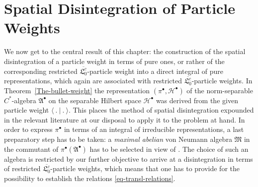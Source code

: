 \documentclass[11pt,twoside,openright]{report}
\theoremstyle{definition}
\theoremstyle{plain}
\theoremstyle{remark}
\theoremstyle{assumption}
\newcommand{\scp}[2]{\langle #1 \vert #2 \rangle}
\newcommand{\Mfrak}{\mathfrak{M}}
\newcommand{\vaccountbar}{\overline{\mathfrak{L}_0^c}}
\newcommand{\Hbullet}{\mathscr{H}^\bullet}
\newcommand{\Abullet}{\mathfrak{A}^\bullet}
\begin{document}
\section[Spatial Disintegration]{Spatial Disintegration of Particle
  Weights}
  \label{sec-spatial-disintegration}

We now get to the central result of this chapter: the construction of
the spatial disintegration of a particle weight in terms of pure ones,
or rather of the corresponding restricted $\vaccountbar$-particle
weight into a direct integral of pure representations, which again
are associated with restricted $\vaccountbar$-particle weights. In
Theorem~\ref{The-bullet-weight} the representation $( \pi^\bullet ,
\Hbullet )$ of the norm-separable $C^*$-algebra $\Abullet$ on the
separable Hilbert space $\Hbullet$ was derived from the given particle
weight $\scp{~.~}{~.~}$. This places the method of spatial
disintegration expounded in the relevant literature at our disposal to
apply it to the problem at hand. In order to express $\pi^\bullet$ in
terms of an integral of irreducible representations, a last
preparatory step has to be taken: a \emph{maximal abelian} von Neumann
algebra $\Mfrak$ in the commutant of $\pi^\bullet ( \Abullet )$ has to
be selected in view of \cite[Theorem~8.5.2]{dixmier:1982}. The choice
of such an algebra is restricted by our further objective to arrive at
a disintegration in terms of restricted $\vaccountbar$-particle
weights, which means that one has to provide for the possibility to
establish the relations \eqref{eq-transl-relations}.
\end{document}
